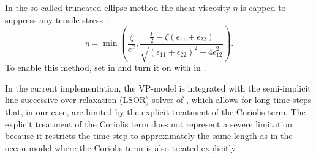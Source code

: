 In the so-called truncated ellipse method the shear viscosity $\eta$
is capped to suppress any tensile stress \citep{hibler97, geiger98}:
\begin{equation}
  \label{eq:etatem}
  \eta = \min\left(\frac{\zeta}{e^2},
  \frac{\frac{P}{2}-\zeta(\dot{\epsilon}_{11}+\dot{\epsilon}_{22})}
  {\sqrt{(\dot{\epsilon}_{11}+\dot{\epsilon}_{22})^2
      +4\dot{\epsilon}_{12}^2}}\right).
\end{equation}
To enable this method, set  in
 and turn it on with
 in . 

In the current implementation, the VP-model is integrated with the
semi-implicit line successive over relaxation (LSOR)-solver of
\citet{zhang97}, which allows for long time steps that, in our case,
are limited by the explicit treatment of the Coriolis term. The
explicit treatment of the Coriolis term does not represent a severe
limitation because it restricts the time step to approximately the
same length as in the ocean model where the Coriolis term is also
treated explicitly.

